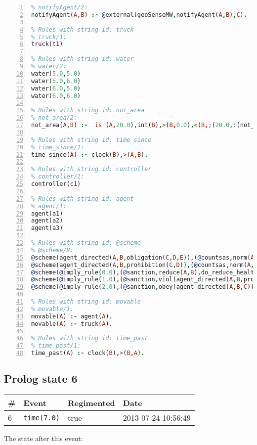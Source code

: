 \documentclass[11pt]{article}\usepackage[utf8]{inputenc}\usepackage{geometry}
\begin{document}
\begin{lstlisting}[language=Prolog, numbers=left]
% Rules with string id: notifyAgent
% notifyAgent/2:
notifyAgent(A,B) :- @external(geoSenseMW,notifyAgent(A,B),C).

% Rules with string id: truck
% truck/1:
truck(t1)

% Rules with string id: water
% water/2:
water(5.0,5.0)
water(5.0,6.0)
water(6.0,5.0)
water(6.0,6.0)

% Rules with string id: not_area
% not_area/2:
not_area(A,B) :-  is (A,20.0),int(B),>(B,0.0),<(B,;(20.0,:(not_area(A,B), is (-(B),20.0)))),int(A),>(A,0.0),<(A,;(20.0,:(area(A,B),-(int(A))))),int(B),>(A,0.0),>(B,0.0),<(A,21.0),<(B,21.0).

% Rules with string id: time_since
% time_since/1:
time_since(A) :- clock(B),>(A,B).

% Rules with string id: controller
% controller/1:
controller(c1)

% Rules with string id: agent
% agent/1:
agent(a1)
agent(a2)
agent(a3)

% Rules with string id: @scheme
% @scheme/8:
@scheme(agent_directed(A,B,obligation(C,D,E)),(@countsas,norm(A,B,F,obligation(C,D,E)),F),false,(listTrue(C)),(time_past(D)),false,[plus(viol(agent_directed(A,B,obligation(C,D,E))))|[]],[plus(obey(agent_directed(A,B,obligation(C,D,E))))|[]])
@scheme(agent_directed(A,B,prohibition(C,D)),(@countsas,norm(A,B,E,prohibition(C,D)),E),(listTrue(C)),false,(false),false,[plus(viol(agent_directed(A,B,prohibition(C,D))))|[]],[plus(obey(agent_directed(A,B,prohibition(C,D))))|[]])
@scheme(@imply_rule(0.0),(@sanction,reduce(A,B),do_reduce_health(A,B),notifyAgent(A,changed(status))),true,false,false,false,[min(reduce(A,B))|[]],[])
@scheme(@imply_rule(1.0),(@sanction,viol(agent_directed(A,B,prohibition(C,D))),do_sanction(D)),true,false,false,false,[min(viol(agent_directed(A,B,prohibition(C,D))))|[]],[])
@scheme(@imply_rule(2.0),(@sanction,obey(agent_directed(A,B,C))),true,false,false,false,[min(obey(agent_directed(A,B,C)))|[]],[])

% Rules with string id: movable
% movable/1:
movable(A) :- agent(A).
movable(A) :- truck(A).

% Rules with string id: time_past
% time_past/1:
time_past(A) :- clock(B),>(B,A).

\end{lstlisting}
\clearpage 
\subsection{Prolog state 6}
\begin{table}[ht]
\centering 
\begin{tabular}{l l l l} 
\textbf{\#} & \textbf{Event} & \textbf{Regimented} & \textbf{Date} \\ [0.5ex] 
\hline
6&\texttt{time(7.0)}&true&2013-07-24 10:56:49\\ [1ex] \hline\end{tabular}
\end{table}
The state after this event:
\end{document}
